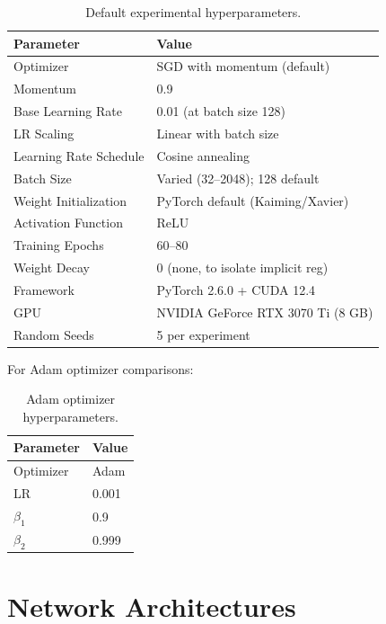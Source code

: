 \documentclass[conference]{IEEEtran}
\begin{document}
\begin{table}[htbp]
\centering
\caption{Default experimental hyperparameters.}
\label{tab:hyperparams}
\begin{tabular}{@{}ll@{}}
\toprule
Parameter & Value \\
\midrule
Optimizer                & SGD with momentum (default) \\
Momentum                 & 0.9 \\
Base Learning Rate       & 0.01 (at batch size 128) \\
LR Scaling               & Linear with batch size \\
Learning Rate Schedule   & Cosine annealing \\
Batch Size               & Varied (32--2048); 128 default \\
Weight Initialization    & PyTorch default (Kaiming/Xavier) \\
Activation Function      & ReLU \\
Training Epochs          & 60--80 \\
Weight Decay             & 0 (none, to isolate implicit reg) \\
Framework                & PyTorch 2.6.0 + CUDA 12.4 \\
GPU                      & NVIDIA GeForce RTX 3070 Ti (8 GB) \\
Random Seeds             & 5 per experiment \\
\bottomrule
\end{tabular}
\end{table}

For Adam optimizer comparisons:

\begin{table}[htbp]
\centering
\caption{Adam optimizer hyperparameters.}
\label{tab:adam_params}
\begin{tabular}{@{}ll@{}}
\toprule
Parameter & Value \\
\midrule
Optimizer & Adam \\
LR        & 0.001 \\
$\beta_1$ & 0.9 \\
$\beta_2$ & 0.999 \\
\bottomrule
\end{tabular}
\end{table}

\section{Network Architectures}
\end{document}

